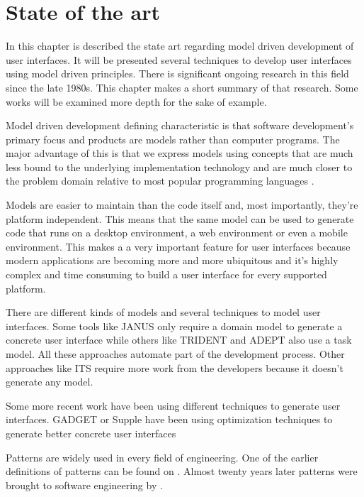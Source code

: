 \chapter{State of the art}
In this chapter is described the state art regarding model driven development of user interfaces. It will be presented several techniques to develop user interfaces using model driven principles. There is significant ongoing research in this field since the late 1980s. This chapter makes a short summary of that research. Some works will be examined more depth for the sake of example. 

Model driven development defining characteristic is that software development's primary focus and products are models rather than computer programs. The major advantage of this is that we express models using concepts that are much less bound to the underlying implementation technology and are much closer to the problem domain relative to most popular programming languages \cite{The_Pragmatics_of_Model-Driven_Development}.

Models are easier to maintain than the code itself and, most importantly, they're platform independent. This means that the same model can be used to generate code that runs on a desktop environment, a web environment or even a mobile environment. This makes a a very important feature for user interfaces because modern applications are becoming more and more ubiquitous and it's highly complex and time consuming to build a user interface for every supported platform.

There are different kinds of models and several techniques to model user interfaces. Some tools like JANUS\cite{janus} only require a domain model to generate a concrete user interface while others like TRIDENT\cite{trident1, trident2} and ADEPT\cite{adept1} also use a task model. All these approaches automate part of the development process. Other approaches like ITS\cite{ITS} require more work from the developers because it doesn't generate any model.

Some more recent work have been using different techniques to generate user interfaces. GADGET\cite{gadget} or Supple\cite{supple} have been using optimization techniques to generate better concrete user interfaces

Patterns are widely used in every field of engineering. One of the earlier definitions of patterns can be found on \cite{A_Pattern_Language_Towns_Buildings_Construction}. Almost twenty years later patterns were brought to software engineering by \cite{Design_Patterns}.

